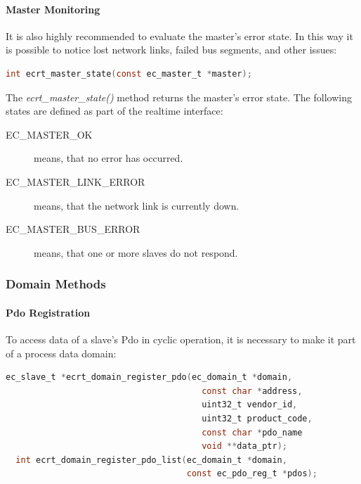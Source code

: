 \documentclass[a4paper,12pt,BCOR6mm,bibtotoc,idxtotoc]{scrbook}
\begin{document}
\paragraph{Master Monitoring}

It is also highly recommended to evaluate the master's error state. In
this way it is possible to notice lost network links, failed bus
segments, and other issues:

\begin{lstlisting}[language=C]
  int ecrt_master_state(const ec_master_t *master);
\end{lstlisting}

The \textit{ecrt\_master\_state()} method returns the master's error
state. The following states are defined as part of the realtime
interface:

\begin{description}
\item[EC\_MASTER\_OK] means, that no error has occurred.
\item[EC\_MASTER\_LINK\_ERROR] means, that the network link is
  currently down.
\item[EC\_MASTER\_BUS\_ERROR] means, that one or more slaves do not
  respond.
\end{description}

\subsubsection{Domain Methods}
\label{sec:ecrt-domain}

\paragraph{Pdo Registration}

To access data of a slave's Pdo in cyclic operation, it is necessary
to make it part of a process data domain:

\begin{lstlisting}[language=C]
  ec_slave_t *ecrt_domain_register_pdo(ec_domain_t *domain,
                                       const char *address,
                                       uint32_t vendor_id,
                                       uint32_t product_code,
                                       const char *pdo_name
                                       void **data_ptr);
  int ecrt_domain_register_pdo_list(ec_domain_t *domain,
                                    const ec_pdo_reg_t *pdos);
\end{lstlisting}
\end{document}
